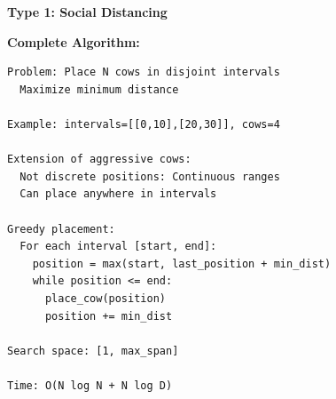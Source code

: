 \documentclass[11pt,a4paper,oneside]{book}
\begin{document}
\begin{tcolorbox}[
    enhanced,breakable,
    colback=lightgray,
    colframe=accentorange,
    boxrule=2pt,
    arc=4mm,
    title=\textbf{Complete Interval-Based Placement Algorithms}
]
\textbf{Type 1: Social Distancing}

\textbf{Complete Algorithm:}
\begin{verbatim}
Problem: Place N cows in disjoint intervals
  Maximize minimum distance
  
Example: intervals=[[0,10],[20,30]], cows=4

Extension of aggressive cows:
  Not discrete positions: Continuous ranges
  Can place anywhere in intervals

Greedy placement:
  For each interval [start, end]:
    position = max(start, last_position + min_dist)
    while position <= end:
      place_cow(position)
      position += min_dist

Search space: [1, max_span]

Time: O(N log N + N log D)
\end{verbatim}
\end{tcolorbox}
\end{document}
